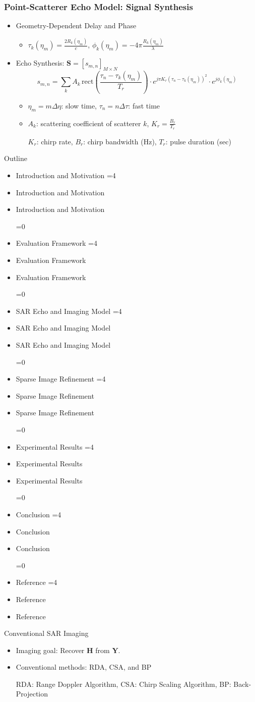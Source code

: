 \documentclass[aspectratio=169, 11pt]{beamer}
\newcommand{\dsrlabActiveSec}{0}
\newcommand{\dsrlaboutlineitem}[2]{%
  \ifnum\dsrlabActiveSec=0
    \item #2
  \else
    \ifnum#1=\dsrlabActiveSec
      \item #2
    \else
      \item {\color{dsrlabGrayLabel}#2}
    \fi
  \fi
}
\newcommand{\dsrlabSectionOutline}[1]{%
  \renewcommand{\dsrlabActiveSec}{#1}%
  \begin{frame}{Outline}
    \begin{itemize}
      \dsrlaboutlineitem{1}{Introduction and Motivation}
      \dsrlaboutlineitem{2}{Evaluation Framework}
      \dsrlaboutlineitem{3}{SAR Echo and Imaging Model}
      \dsrlaboutlineitem{4}{Sparse Image Refinement}
      \dsrlaboutlineitem{5}{Experimental Results}
      \dsrlaboutlineitem{6}{Conclusion}
      \dsrlaboutlineitem{7}{Reference}
    \end{itemize}
  \end{frame}
}
\begin{document}
{
\begin{frame}
  \frametitle{Point-Scatterer Echo Model: Signal Synthesis}
  \begin{itemize}
    \item Geometry-Dependent Delay and Phase
    \begin{itemize}
      \item $\tau_k(\eta_m)=\frac{2R_k(\eta_m)}{c}$, $\phi_k(\eta_m)=-4\pi\frac{R_k(\eta_m)}{\lambda}$
    \end{itemize}
    \item Echo Synthesis: $\mathbf{S} = [s_{m,n}]_{M\times N}$
    $$
      s_{m,n} = \sum_k A_k\,\mathrm{rect}\!\left(\frac{\tau_n - \tau_k(\eta_m)}{T_r}\right)
            \cdot e^{j\pi K_r\left(\tau_n - \tau_k(\eta_m)\right)^2}
            \cdot e^{j\phi_k(\eta_m)}
    $$
    \begin{itemize}
      \item $\eta_m = m\Delta\eta$: slow time, $\tau_n = n\Delta\tau$: fast time
      \item $A_k$: scattering coefficient of scatterer $k$, $K_r=\frac{B_r}{T_r}$

      {\footnotesize $K_r$: chirp rate, $B_r$: chirp bandwidth (Hz), $T_r$: pulse duration (sec)}
    \end{itemize}
  \end{itemize}
\end{frame}
}

\dsrlabSectionOutline{4}

\begin{frame}{Conventional SAR Imaging}
  \resizebox{0.6\textwidth}{!}{}
  \begin{itemize}
    \item Imaging goal: Recover $\mathbf{H}$ from $\mathbf{Y}$.
    \item Conventional methods: RDA, CSA, and BP

    {\footnotesize RDA: Range Doppler Algorithm, CSA: Chirp Scaling Algorithm, BP: Back-Projection}
\end{itemize}
\end{frame}
\end{document}
